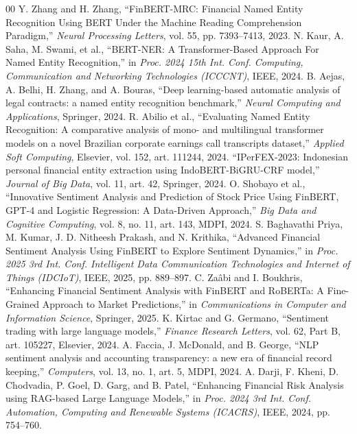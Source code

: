 \documentclass[conference]{IEEEtran}
\begin{document}
\begin{thebibliography}{00}
 Y. Zhang and H. Zhang, ``FinBERT-MRC: Financial Named Entity Recognition Using BERT Under the Machine Reading Comprehension Paradigm,'' \textit{Neural Processing Letters}, vol. 55, pp. 7393--7413, 2023.
 N. Kaur, A. Saha, M. Swami, et al., ``BERT-NER: A Transformer-Based Approach For Named Entity Recognition,'' in \textit{Proc. 2024 15th Int. Conf. Computing, Communication and Networking Technologies (ICCCNT)}, IEEE, 2024.
 B. Aejas, A. Belhi, H. Zhang, and A. Bouras, ``Deep learning-based automatic analysis of legal contracts: a named entity recognition benchmark,'' \textit{Neural Computing and Applications}, Springer, 2024.
 R. Abilio et al., ``Evaluating Named Entity Recognition: A comparative analysis of mono- and multilingual transformer models on a novel Brazilian corporate earnings call transcripts dataset,'' \textit{Applied Soft Computing}, Elsevier, vol. 152, art. 111244, 2024.
 ``IPerFEX-2023: Indonesian personal financial entity extraction using IndoBERT-BiGRU-CRF model,'' \textit{Journal of Big Data}, vol. 11, art. 42, Springer, 2024.
 O. Shobayo et al., ``Innovative Sentiment Analysis and Prediction of Stock Price Using FinBERT, GPT-4 and Logistic Regression: A Data-Driven Approach,'' \textit{Big Data and Cognitive Computing}, vol. 8, no. 11, art. 143, MDPI, 2024.
 S. Baghavathi Priya, M. Kumar, J. D. Nitheesh Prakash, and N. Krithika, ``Advanced Financial Sentiment Analysis Using FinBERT to Explore Sentiment Dynamics,'' in \textit{Proc. 2025 3rd Int. Conf. Intelligent Data Communication Technologies and Internet of Things (IDCIoT)}, IEEE, 2025, pp. 889--897.
 C. Zaâbi and I. Boukhris, ``Enhancing Financial Sentiment Analysis with FinBERT and RoBERTa: A Fine-Grained Approach to Market Predictions,'' in \textit{Communications in Computer and Information Science}, Springer, 2025.
 K. Kirtac and G. Germano, ``Sentiment trading with large language models,'' \textit{Finance Research Letters}, vol. 62, Part B, art. 105227, Elsevier, 2024.
 A. Faccia, J. McDonald, and B. George, ``NLP sentiment analysis and accounting transparency: a new era of financial record keeping,'' \textit{Computers}, vol. 13, no. 1, art. 5, MDPI, 2024.
 A. Darji, F. Kheni, D. Chodvadia, P. Goel, D. Garg, and B. Patel, ``Enhancing Financial Risk Analysis using RAG-based Large Language Models,'' in \textit{Proc. 2024 3rd Int. Conf. Automation, Computing and Renewable Systems (ICACRS)}, IEEE, 2024, pp. 754--760.

\end{thebibliography}
\end{document}
